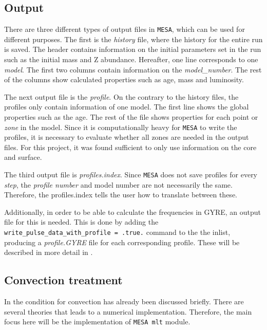 \subsection{Output}
There are three different types of output files in \texttt{MESA}, which can be used for different purposes. The first is the \textit{history} file, where the history for the entire run is saved. The header contains information on the initial parameters set in the run such as the initial mass and Z abundance. Hereafter, one line corresponds to one \textit{model}. The first two columns contain information on the \textit{model\_number}. The rest of the columns show calculated properties such as age, mass and luminosity. 

The next output file is the \textit{profile}. On the contrary to the history files, the profiles only contain information of one model. The first line shows the global properties such as the age. The rest of the file shows properties for each point or \textit{zone} in the model. Since it is computationally heavy for \texttt{MESA} to write the profiles, it is necessary to evaluate whether all zones are needed in the output files. For this project, it was found sufficient to only use information on the core and surface. 

The third output file is \textit{profiles.index}. Since \texttt{MESA} does not save profiles for every \textit{step}, the \textit{profile number} and model number are not necessarily the same. Therefore, the profiles.index tells the user how to translate between these.

Additionally, in order to be able to calculate the frequencies in GYRE, an output file for this is needed. This is done by adding the \texttt{write\_pulse\_data\_with\_profile = .true.} command to the the inlist, producing a \textit{profile.GYRE} file for each corresponding profile. These will be described in more detail in .


\subsection{Convection treatment}
\label{sec:conv_prescriptions}

In  the condition for convection has already been discussed briefly. There are several theories that leads to a numerical implementation.  Therefore, the main focus here will be the implementation of \texttt{MESA mlt} module. 

